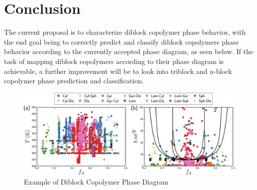 \documentclass{article}
\begin{document}
 \section{Conclusion}
The current proposal is to characterize diblock copolymer phase behavior, with the end goal being to correctly predict and classify diblock copolymers phase behavior according to the currently accepted phase diagram, as seen below. If the task of mapping diblock copolymers according to their phase diagram is achievable, a further improvement will be to look into triblock and n-block copolymer phase prediction and classification.

\begin{figure}[h]
\caption{Example of Diblock Copolymer Phase Diagram\cite{RandForest}}
\centering
\includegraphics[width=\textwidth]{template/images_large_mz1c00521_0001.jpeg}
\end{figure}




\end{document}
